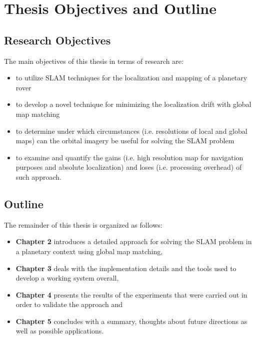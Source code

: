 \section{Thesis Objectives and Outline}

\subsection{Research Objectives}

The main objectives of this thesis in terms of research are:

\begin{itemize}
    \item to utilize SLAM techniques for the localization and mapping
        of a planetary rover
    \item to develop a novel technique for minimizing the localization
        drift with global map matching
    \item to determine under which circumstances (i.e. resolutions of
        local and global maps) can the orbital imagery be useful for
        solving the SLAM problem
    \item to examine and quantify the gains (i.e. high resolution map for
        navigation purposes and absolute localization) and loses
        (i.e. processing overhead) of such approach.
\end{itemize}

\subsection{Outline}

The remainder of this thesis is organized as follows:
\begin{itemize}
    \item \textbf{Chapter 2} introduces a detailed approach for solving the
        SLAM problem in a planetary context using global map matching,
    \item \textbf{Chapter 3} deals with the implementation details and
        the tools used to develop a working system overall,
    \item \textbf{Chapter 4} presents the results of the experiments that
        were carried out in order to validate the approach and
    \item \textbf{Chapter 5} concludes with a summary, thoughts about future
        directions as well as possible applications.
\end{itemize}

